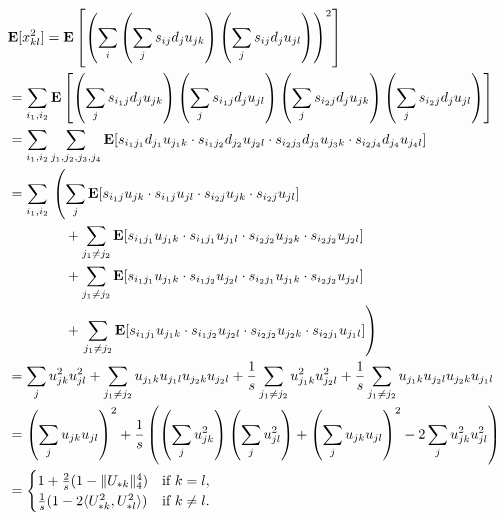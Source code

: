 \documentclass[11pt]{article}
\begin{document}
\begin{align*}
  &\mathbf{E}[x_{kl}^2] = \mathbf{E}\left[ \left(\sum_i \left(\sum_{j} s_{ij} d_j u_{jk}\right)\left(\sum_{j} s_{ij} d_j u_{jl} \right)\right)^2 \right] \\
  &= \sum_{i_1, i_2} \mathbf{E} \left[ \left(\sum_{j} s_{i_1j} d_j u_{jk}\right)\left(\sum_{j} s_{i_1j} d_j u_{jl} \right) \left(\sum_{j} s_{i_2j} d_j u_{jk}\right)\left(\sum_{j} s_{i_2j} d_j u_{jl} \right) \right] \\
  &= \sum_{i_1, i_2} \sum_{j_1, j_2, j_3, j_4} \mathbf{E} [ s_{i_1j_1} d_{j_1} u_{j_1k} \cdot s_{i_1j_2} d_{j_2} u_{j_2 l} \cdot s_{i_2j_3} d_{j_3} u_{j_3k} \cdot s_{i_2j_4} d_{j_4} u_{j_4 l} ] \\
  &= \sum_{i_1, i_2}
  \begin{aligned}[t]
    &\left( \sum_{j} \mathbf{E} [ s_{i_1j} u_{jk} \cdot s_{i_1j} u_{j l} \cdot s_{i_2j} u_{jk} \cdot s_{i_2j} u_{j l} ]  \right.\\
    &\quad \null + \sum_{j_1 \neq j_2} \mathbf{E} [ s_{i_1j_1} u_{j_1k} \cdot s_{i_1j_1} u_{j_1 l} \cdot s_{i_2j_2} u_{j_2k} \cdot s_{i_2j_2} u_{j_2 l} ] \\
    &\quad \null + \sum_{j_1 \neq j_2 } \mathbf{E} [ s_{i_1j_1} u_{j_1k}
    \cdot s_{i_1j_2} u_{j_2 l} \cdot s_{i_2j_1} u_{j_1k} \cdot s_{i_2j_2} u_{j_2 l} ] \\
    &\quad \null + \left. \sum_{j_1 \neq j_2} \mathbf{E} [ s_{i_1j_1} u_{j_1k}
      \cdot s_{i_1j_2} u_{j_2 l} \cdot s_{i_2j_2}
      u_{j_2k} \cdot s_{i_2j_1} u_{j_1 l} ] \right) \\
  \end{aligned} \\
  &= \sum_j  u_{jk}^2 u_{jl}^2 + \sum_{j_1 \neq j_2} u_{j_1k} u_{j_1 l} u_{j_2k} u_{j_2 l} + \frac{1}{s} \sum_{j_1 \neq j_2} u_{j_1k}^2 u_{j_2 l}^2 + \frac{1}{s} \sum_{j_1 \neq j_2} u_{j_1k} u_{j_2l} u_{j_2k} u_{j_1l} \\
  &= \left( \sum_j u_{jk} u_{jl} \right)^2 + \frac{1}{s} \left( \left(\sum_j u_{jk}^2 \right)\left(\sum_j u_{jl}^2\right) + \left(\sum_j u_{jk} u_{jl}\right)^2 - 2 \sum_j u_{jk}^2 u_{jl}^2 \right) \\
  &=
  \begin{cases}
    1 + \frac{2}{s} ( 1 - \|U_{*k}\|_4^4 ) & \text{if } k = l,\\
    \frac{1}{s} ( 1 - 2 \langle U_{*k}^2, U_{*l}^2 \rangle ) & \text{if } k \neq l.\\
  \end{cases}
\end{align*}
\end{document}
